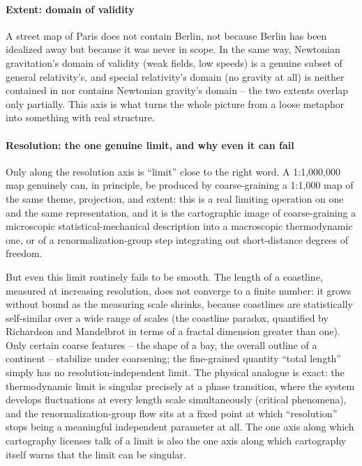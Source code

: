 \paragraph{Extent: domain of validity}

A street map of Paris does not contain Berlin, not because Berlin has been
idealized away but because it was never in scope. In the same way, Newtonian
gravitation's domain of validity (weak fields, low speeds) is a genuine subset
of general relativity's, and special relativity's domain (no gravity at all) is
neither contained in nor contains Newtonian gravity's domain -- the two extents
overlap only partially. This axis is what turns the whole picture from a loose
metaphor into something with real structure. 

\paragraph{Resolution: the one genuine limit, and why even it can fail}


Only along the resolution axis is ``limit'' close to the right word. A
1:1{,}000{,}000 map genuinely can, in principle, be produced by coarse-graining
a 1:1{,}000 map of the same theme, projection, and extent: this is a real
limiting operation on one and the same representation, and it is the
cartographic image of coarse-graining a microscopic statistical-mechanical
description into a macroscopic thermodynamic one, or of a renormalization-group
step integrating out short-distance degrees of freedom.

But even this limit routinely fails to be smooth. The length of a coastline,
measured at increasing resolution, does not converge to a finite number: it
grows without bound as the measuring scale shrinks, because coastlines are
statistically self-similar over a wide range of scales (the coastline paradox,
quantified by Richardson and Mandelbrot in terms of a fractal dimension greater
than one). Only certain coarse features -- the shape of a bay, the overall
outline of a continent -- stabilize under coarsening; the fine-grained quantity
``total length'' simply has no resolution-independent limit. The physical
analogue is exact: the thermodynamic limit is singular precisely at a phase
transition, where the system develops fluctuations at every length scale
simultaneously (critical phenomena), and the renormalization-group flow sits at
a fixed point at which ``resolution'' stops being a meaningful independent
parameter at all. The one axis along which cartography licenses talk of a limit
is also the one axis along which cartography itself warns that the limit can be
singular.

